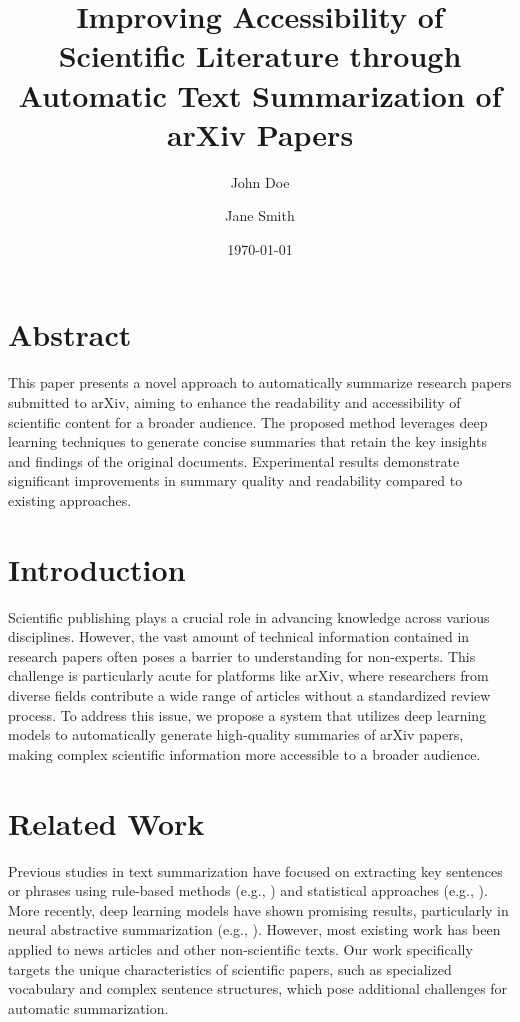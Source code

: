 \documentclass{article}
\title{Improving Accessibility of Scientific Literature through Automatic Text Summarization of arXiv Papers}
\author{John Doe \and Jane Smith}
\date{\today}
\begin{document}
\maketitle

\section*{Abstract}
This paper presents a novel approach to automatically summarize research papers submitted to arXiv, aiming to enhance the readability and accessibility of scientific content for a broader audience. The proposed method leverages deep learning techniques to generate concise summaries that retain the key insights and findings of the original documents. Experimental results demonstrate significant improvements in summary quality and readability compared to existing approaches.

\section{Introduction}
\label{sec:intro}
Scientific publishing plays a crucial role in advancing knowledge across various disciplines. However, the vast amount of technical information contained in research papers often poses a barrier to understanding for non-experts. This challenge is particularly acute for platforms like arXiv, where researchers from diverse fields contribute a wide range of articles without a standardized review process. To address this issue, we propose a system that utilizes deep learning models to automatically generate high-quality summaries of arXiv papers, making complex scientific information more accessible to a broader audience.

\section{Related Work}
\label{sec:related_work}
Previous studies in text summarization have focused on extracting key sentences or phrases using rule-based methods (e.g., \cite{rule_based_summarization}) and statistical approaches (e.g., \cite{statistical_summarization}). More recently, deep learning models have shown promising results, particularly in neural abstractive summarization (e.g., \cite{neural_abstractive_summarization}). However, most existing work has been applied to news articles and other non-scientific texts. Our work specifically targets the unique characteristics of scientific papers, such as specialized vocabulary and complex sentence structures, which pose additional challenges for automatic summarization.
\end{document}
